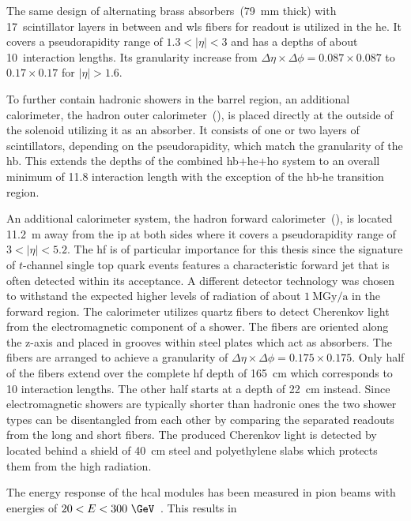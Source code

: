The same design of alternating brass absorbers~(79~mm thick) with 17~scintillator layers in between and \gls{wls} fibers for readout is utilized in the \gls{he}. It covers a pseudorapidity range of $1.3<|\eta|<3$ and has a depths of about 10~interaction lengths. Its granularity increase from $\Delta\eta\times\Delta\phi=0.087\times0.087$ to $0.17\times0.17$ for $|\eta|>1.6$.

To further contain hadronic showers in the barrel region, an additional calorimeter, the hadron outer calorimeter~(), is placed directly at the outside of the solenoid utilizing it as an absorber. It consists of one or two layers of scintillators, depending on the pseudorapidity, which match the granularity of the \gls{hb}. This extends the depths of the combined \gls{hb}+\gls{he}+\gls{ho} system to an overall minimum of 11.8 interaction length with the exception of the \gls{hb}-\gls{he} transition region.

An additional calorimeter system, the hadron forward calorimeter~(), is located 11.2~m away from the \gls{ip} at both sides where it covers a pseudorapidity range of $3<|\eta|<5.2$. The \gls{hf} is of particular importance for this thesis since the signature of $t$-channel single top quark events features a characteristic forward jet that is often detected within its acceptance. A different detector technology was chosen to withstand the expected higher levels of radiation of about $1~\mathrm{MGy/a}$ in the forward region. The calorimeter utilizes quartz fibers to detect Cherenkov light from the electromagnetic component of a shower. The fibers are oriented along the z-axis and placed in grooves within steel plates which act as absorbers. The fibers are arranged to achieve a granularity of $\Delta\eta\times\Delta\phi=0.175\times0.175$. Only half of the fibers extend over the complete \gls{hf} depth of 165~cm which corresponds to 10 interaction lengths. The other half starts at a depth of 22~cm instead. Since electromagnetic showers are typically shorter than hadronic ones the two shower types can be disentangled from each other by comparing the separated readouts from the long and short fibers. The produced Cherenkov light is detected by  located behind a shield of 40~cm steel and polyethylene slabs which protects them from the high radiation.

The energy response of the \gls{hcal} modules has been measured in pion beams with energies of $20<E<300~\GeV$~\cite{Baiatian:1049915}. This results in 

